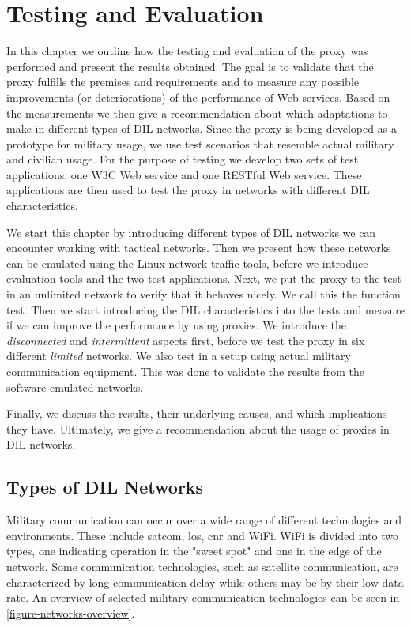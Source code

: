 \chapter{Testing and Evaluation}

\label{chapter:evaluation}

In this chapter we outline how the testing and evaluation of the proxy was
performed and present the results obtained. The goal is to validate that the
proxy fulfills the premises and requirements and to measure any possible
improvements (or deteriorations) of the performance of Web services. Based on
the measurements we then give a recommendation about which adaptations to make
in different types of DIL networks. Since the proxy is being developed as a
prototype for military usage, we use test scenarios that resemble actual
military and civilian usage. For the purpose of testing we develop two sets of
test applications, one W3C Web service and one RESTful Web service. These
applications are then used to test the proxy in networks with different DIL
characteristics.

We start this chapter by introducing different types of DIL networks we can
encounter working with tactical networks. Then we present how these networks can
be emulated using the Linux network traffic tools, before we introduce
evaluation tools and the two test applications. Next, we put the proxy to the
test in an unlimited network to verify that it behaves nicely. We call this the
function test. Then we start introducing the DIL characteristics into the tests
and measure if we can improve the performance by using proxies. We introduce the
\textit{disconnected} and \textit{intermittent} aspects first, before we test
the proxy in six different \textit{limited} networks. We also test in a setup
using actual military communication equipment. This was done to validate the
results from the software emulated networks.

Finally, we discuss the results, their underlying causes, and which implications
they have. Ultimately, we give a recommendation about the usage of proxies in
DIL networks.

\section{Types of DIL Networks}

Military communication can occur over a wide range of different technologies and
environments. These include \gls{satcom}, \gls{los}, \gls{cnr} and WiFi. WiFi is
divided into two types, one indicating operation in the "sweet spot" and one in
the edge of the network. Some communication technologies, such as satellite
communication, are characterized by long communication delay while others may be
by their low data rate. An overview of selected military communication
technologies can be seen in \cref{figure-networks-overview}.

